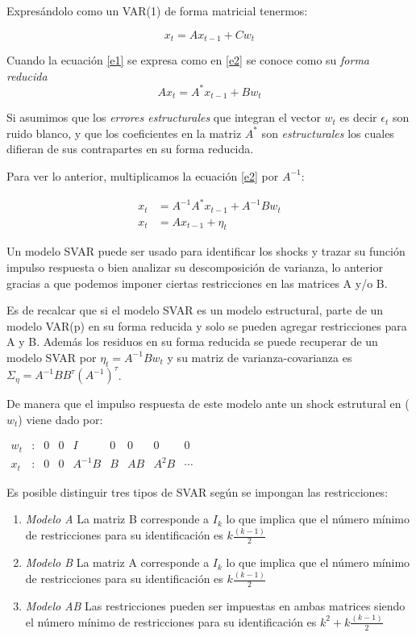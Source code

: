 \documentclass[
]{book}
\begin{document}
Expresándolo como un VAR(1) de forma matricial tenermos:

\begin{equation}
\label{e1}
x_t = Ax_{t−1} + Cw_t
\end{equation}

Cuando la ecuación \autoref{e1} se expresa como en \autoref{e2} se conoce como su \emph{forma reducida}
\begin{equation}
\label{e2}
Ax_t = A^{*}x_{t−1} + Bw_t
\end{equation}

Si asumimos que los \emph{errores estructurales} que integran el vector \(w_{t}\) es decir \(\epsilon_{t}\) son ruido blanco, y que los coeficientes en la matriz \(A^{*}\) son \emph{estructurales} los cuales difieran de sus contrapartes en su forma reducida.

Para ver lo anterior, multiplicamos la ecuación \autoref{e2} por \(A^{-1}\):

\begin{align}
x_t &= A^{-1}A^{*}x_{t−1} + A^{-1}Bw_t\\
x_t &= Ax_{t−1} + \eta_t
\end{align}

Un modelo SVAR puede ser usado para identificar los shocks y trazar su función impulso respuesta o bien analizar su descomposición de varianza, lo anterior gracias a que podemos imponer ciertas restricciones en las matrices A y/o B.

Es de recalcar que si el modelo SVAR es un modelo estructural, parte de un modelo VAR(p) en su forma reducida y solo se pueden agregar restricciones para A y B. Además los residuos en su forma reducida se puede recuperar de un modelo SVAR por \(\eta_t=A^{-1}Bw_t\) y su matriz de varianza-covarianza es \(\Sigma_\eta=A^{-1}BB^{\tau}(A^{-1})^{\tau}\).

De manera que el impulso respuesta de este modelo ante un shock estrutural en (\(w_t\)) viene dado por:

\(\begin{array}{ccccccccc} w_{t} &\colon &0&0&I&0&0&0&0 \\ x_{t} &\colon &0&0&A^{-1}B&B&AB&A^{2}B&\cdots \end{array}\)

Es posible distinguir tres tipos de SVAR según se impongan las restricciones:

\begin{enumerate}
\def\labelenumi{\arabic{enumi}.}
\item
  \emph{Modelo A} La matriz B corresponde a \(I_{k}\) lo que implica que el número mínimo de restricciones para su identificación es \(k\frac{(k-1)}{2}\)
\item
  \emph{Modelo B} La matriz A corresponde a \(I_{k}\) lo que implica que el número mínimo de restricciones para su identificación es \(k\frac{(k-1)}{2}\)
\item
  \emph{Modelo AB} Las restricciones pueden ser impuestas en ambas matrices siendo el número mínimo de restricciones para su identificación es \(k^{2}+k\frac{(k-1)}{2}\)
\end{enumerate}
\end{document}
